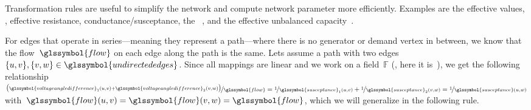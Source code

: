 % 
% 
Transformation rules are useful to simplify the network and compute network
parameter more efficiently. Examples are the effective values, \eg, effective
resistance, conductance/susceptance, the ~\parencite{Ros24,But21}, and the effective unbalanced
capacity~\parencite[p.916]{Ros24}.

For edges that operate in series---meaning they represent a path---where there
is no generator or demand vertex in between, we know that the
flow~$\glssymbol{flow}$ on each edge along the path is the same. Lets assume a
path with two edges~$
    \{\vertexa,\vertexb\},
    \{\vertexb,\vertexc\}
    \in
    \glssymbol{undirectededges}
$. Since all mappings are linear and we work on a field~$\mathbb F$
(\ie, here it is~\reals), we get the following relationship~$
    \nicefrac{
        \big(
            \glssymbol{voltageangledifference}_1(\vertexa,\vertexb)
            + 
            \glssymbol{voltageangledifference}_2(\vertexb,\vertexc)
        \big)
    }{ 
        \glssymbol{flow}
    }
    =
    \nicefrac{1}{ \glssymbol{susceptance}_1(\vertexa,\vertexb) }
    +
    \nicefrac{1}{ \glssymbol{susceptance}_2(\vertexb,\vertexc) }
    =
    \nicefrac{1}{ \glssymbol{susceptance}(\vertexa,\vertexc) }
$ with~$
    \glssymbol{flow}(\vertexa,\vertexb) 
    = 
    \glssymbol{flow}(\vertexb,\vertexc) 
    = 
    \glssymbol{flow}
$, which we will generalize in the following rule.
% 
